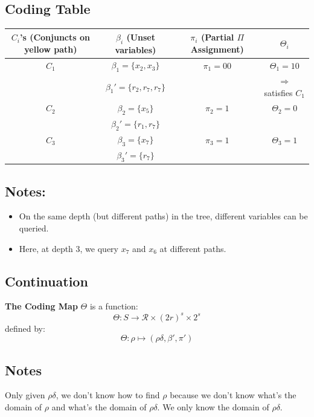 \subsection*{Coding Table}
\begin{center}
\begin{tabular}{|c|c|c|c|}
\hline
\( C_i \)'s (Conjuncts on yellow path) & \( \beta_i \) (Unset variables) & \( \pi_i \) (Partial \( \Pi \) Assignment) & \( \Theta_i \) \\ 
\hline
\( C_1 \) & \( \beta_1 = \{x_2, x_3\} \) & \( \pi_1 = 00 \) & \( \Theta_1 = 10 \) \\
         & \( \beta_1' = \{r_2, r_7, r_7\} \) & & \( \Rightarrow \) satisfies \( C_1 \) \\
\hline
\( C_2 \) & \( \beta_2 = \{x_5\} \) & \( \pi_2 = 1 \) & \( \Theta_2 = 0 \) \\
         & \( \beta_2' = \{r_1, r_7\} \) & & \\
\hline
\( C_3 \) & \( \beta_3 = \{x_7\} \) & \( \pi_3 = 1 \) & \( \Theta_3 = 1 \) \\
         & \( \beta_3' = \{r_7\} \) & & \\
\hline
\end{tabular}
\end{center}

\subsection*{Notes:}
\begin{itemize}
    \item On the same depth (but different paths) in the tree, different variables can be queried.
    \item Here, at depth 3, we query \( x_7 \) and \( x_6 \) at different paths.
\end{itemize}

\subsection*{Continuation}

\noindent
\textbf{The Coding Map} \( \Theta \) is a function:
\[
\Theta: S \to \mathcal{R} \times (2r)^s \times 2^s
\]
defined by:
\[
\Theta: \rho \mapsto (\rho\delta, \beta', \pi')
\]

\subsection*{Notes}
\noindent
Only given \( \rho\delta \), we don't know how to find \( \rho \) because we don't know what's the domain of \( \rho \) and what's the domain of \( \rho\delta \). We only know the domain of \( \rho\delta \).

